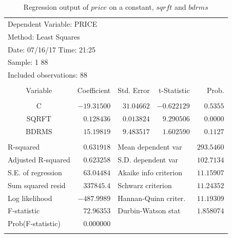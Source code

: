 \documentclass[12pt]{report}
\begin{document}
\begin{table}[H]
	\centering
	\begin{tabular}{lrrrr}
		\multicolumn{3}{l}{Dependent Variable: PRICE}&\multicolumn{1}{c}{}&\multicolumn{1}{c}{}\\
		\multicolumn{3}{l}{Method: Least Squares}&\multicolumn{1}{c}{}&\multicolumn{1}{c}{}\\
		\multicolumn{3}{l}{Date: 07/16/17   Time: 21:25}&\multicolumn{1}{c}{}&\multicolumn{1}{c}{}\\
		\multicolumn{2}{l}{Sample: 1 88}&\multicolumn{1}{c}{}&\multicolumn{1}{c}{}&\multicolumn{1}{c}{}\\
		\multicolumn{3}{l}{Included observations: 88}&\multicolumn{1}{c}{}&\multicolumn{1}{c}{}\\
		[4.5pt] \hline \\ [-4.5pt]
		\multicolumn{1}{c}{Variable}&\multicolumn{1}{r}{Coefficient}&\multicolumn{1}{r}{Std. Error}&\multicolumn{1}{r}{t-Statistic}&\multicolumn{1}{r}{Prob.}\\
		[4.5pt] \hline \\ [-4.5pt]
		\multicolumn{1}{c}{C}&\multicolumn{1}{r}{$-19.31500$}&\multicolumn{1}{r}{$31.04662$}&\multicolumn{1}{r}{$-0.622129$}&\multicolumn{1}{r}{$0.5355$}\\
		\multicolumn{1}{c}{SQRFT}&\multicolumn{1}{r}{$0.128436$}&\multicolumn{1}{r}{$0.013824$}&\multicolumn{1}{r}{$9.290506$}&\multicolumn{1}{r}{$0.0000$}\\
		\multicolumn{1}{c}{BDRMS}&\multicolumn{1}{r}{$15.19819$}&\multicolumn{1}{r}{$9.483517$}&\multicolumn{1}{r}{$1.602590$}&\multicolumn{1}{r}{$0.1127$}\\
		[4.5pt] \hline \\ [-4.5pt]
		\multicolumn{1}{l}{R-squared}&\multicolumn{1}{r}{$0.631918$}&\multicolumn{2}{l}{Mean dependent var}&\multicolumn{1}{r}{$293.5460$}\\
		\multicolumn{1}{l}{Adjusted R-squared}&\multicolumn{1}{r}{$0.623258$}&\multicolumn{2}{l}{S.D. dependent var}&\multicolumn{1}{r}{$102.7134$}\\
		\multicolumn{1}{l}{S.E. of regression}&\multicolumn{1}{r}{$63.04484$}&\multicolumn{2}{l}{Akaike info criterion}&\multicolumn{1}{r}{$11.15907$}\\
		\multicolumn{1}{l}{Sum squared resid}&\multicolumn{1}{r}{$337845.4$}&\multicolumn{2}{l}{Schwarz criterion}&\multicolumn{1}{r}{$11.24352$}\\
		\multicolumn{1}{l}{Log likelihood}&\multicolumn{1}{r}{$-487.9989$}&\multicolumn{2}{l}{Hannan-Quinn criter.}&\multicolumn{1}{r}{$11.19309$}\\
		\multicolumn{1}{l}{F-statistic}&\multicolumn{1}{r}{$72.96353$}&\multicolumn{2}{l}{Durbin-Watson stat}&\multicolumn{1}{r}{$1.858074$}\\
		\multicolumn{1}{l}{Prob(F-statistic)}&\multicolumn{1}{r}{$0.000000$}&\multicolumn{1}{c}{}&\multicolumn{1}{c}{}&\multicolumn{1}{c}{}\\
		[4.5pt] \hline \\ [-4.5pt]
	\end{tabular}
	\caption{Regression output of $price$ on a constant, $sqrft$ and $bdrms$}
	\label{tbl:regout3}
\end{table}
\end{document}
